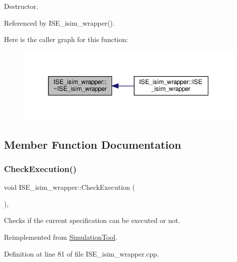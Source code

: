 Destructor. 



Referenced by I\+S\+E\+\_\+isim\+\_\+wrapper().

Here is the caller graph for this function\+:
\nopagebreak
\begin{figure}[H]
\begin{center}
\leavevmode
\includegraphics[width=337pt]{d2/d37/classISE__isim__wrapper_ad3813f02064fe3ccccbc42dac0e8c8d2_icgraph}
\end{center}
\end{figure}


\subsection{Member Function Documentation}
\mbox{\label{classISE__isim__wrapper_ab7b4139eab5055486945c1547569276f}} 
\subsubsection{\texorpdfstring{Check\+Execution()}{CheckExecution()}}
{\footnotesize\ttfamily void I\+S\+E\+\_\+isim\+\_\+wrapper\+::\+Check\+Execution (\begin{DoxyParamCaption}{ }\end{DoxyParamCaption})\hspace{0.3cm}{\ttfamily [override]}, {\ttfamily [virtual]}}



Checks if the current specification can be executed or not. 



Reimplemented from \hyperlink{classSimulationTool_a24b4cde0b09c7496918d20f3896989b6}{Simulation\+Tool}.



Definition at line 81 of file I\+S\+E\+\_\+isim\+\_\+wrapper.\+cpp.



